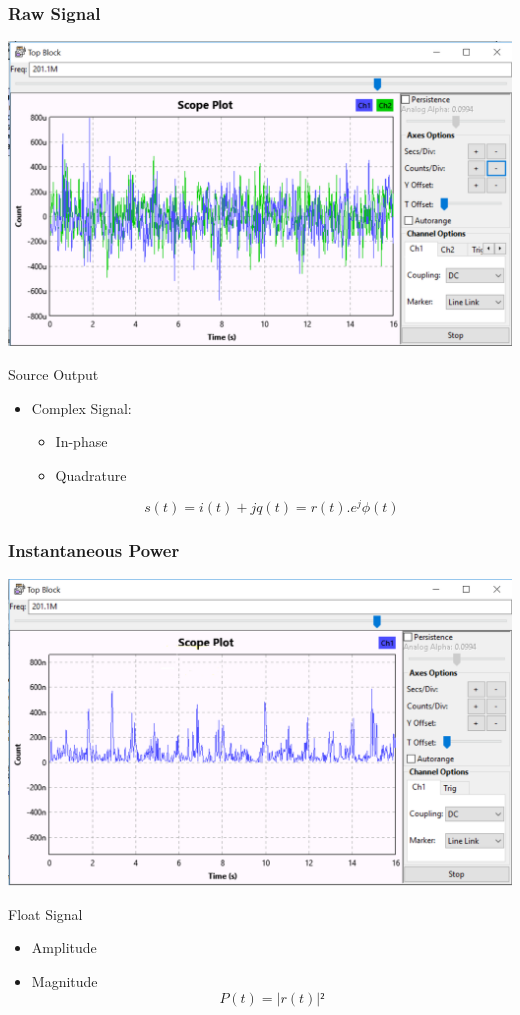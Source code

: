 \begin{frame}
	\frametitle{Raw Signal}
	\centering \includegraphics[scale=.2]{images/raw_sig.png}
	\begin{block}{Source Output}
		\begin{itemize}
			\item Complex Signal:
			\begin{itemize}
				\item In-phase 
				\item Quadrature
			\end{itemize}
			\[s(t)=i(t)+jq(t)=r(t).e^j\phi(t) \]
		\end{itemize}
	\end{block}
\end{frame}

\begin{frame}
	\frametitle{Instantaneous Power}
	\centering \includegraphics[scale=.2]{images/apres_mag2.png}
	\begin{block}{Float Signal}
		\begin{itemize}
			\item Amplitude
			\item Magnitude
			\[P(t)=|r(t)|²\]
		\end{itemize}
	\end{block}
\end{frame}

